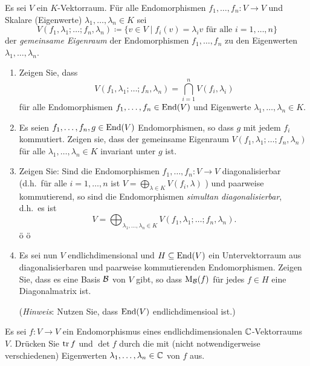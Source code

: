 \documentclass[a4paper,10pt]{scrartcl}
\begin{document}
\begin{question}
  Es sei $V$ ein $K$-Vektorraum.
  Für alle Endomorphismen $f_1, \dotsc, f_n \colon V  \to V$ und Skalare (Eigenwerte) \mbox{$\lambda_1, \dotsc, \lambda_n \in K$} sei
  \[
              V(f_1, \lambda_1; \dotsc; f_n, \lambda_n)
    \coloneqq \{ v \in V \mid \text{$f_i(v) = \lambda_i v$ für alle $i = 1, \dotsc, n$} \}
  \]
  der \emph{gemeinsame Eigenraum} der Endomorphismen $f_1, \dotsc, f_n$ zu den Eigenwerten $\lambda_1, \dotsc, \lambda_n$.
  \begin{enumerate}[leftmargin=*]
    \item
      Zeigen Sie, dass
      \[
          V(f_1, \lambda_1; \dotsc; f_n, \lambda_n)
        = \bigcap_{i=1}^n V(f_i, \lambda_i)
      \]
      für alle Endomorphismen $f_1, \dotsc, f_n \in \operatorname{End}(V)$ und Eigenwerte $\lambda_1, \dotsc, \lambda_n \in K$.
    \item
      Es seien $f_1, \dotsc, f_n, g \in \operatorname{End}(V)$ Endomorphismen, so dass $g$ mit jedem $f_i$ kommutiert.
      Zeigen sie, dass der gemeinsame Eigenraum $V(f_1, \lambda_1; \dots; f_n, \lambda_n)$ für alle $\lambda_1, \dotsc, \lambda_n \in K$ invariant unter $g$ ist.
    \item
      Zeigen Sie: Sind die Endomorphismen $f_1, \dotsc, f_n \colon V \to V$ diagonalisierbar (d.h.\ für alle $i = 1, \dotsc, n$ ist $V = \bigoplus_{\lambda \in K} V(f_i, \lambda)$ ) und paarweise kommutierend, so sind die Endomorphismen \emph{simultan diagonalisierbar}, d.h.\ es ist
      \[
          V
        = \bigoplus_{\lambda_1, \dotsc, \lambda_n \in K}  V(f_1, \lambda_1; \dotsc; f_n, \lambda_n).
      \]
ö    ö\item
      Es sei nun $V$ endlichdimensional und $H \subseteq \operatorname{End}(V)$ ein Untervektorraum aus diagonalisierbaren und paarweise kommutierenden Endomorphismen.
      Zeigen Sie, dass es eine Basis $\mathcal{B}$ von $V$ gibt, so dass $\operatorname{M}_{\mathcal{B}}(f)$ für jedes $f \in H$ eine Diagonalmatrix ist.
      
      (\emph{Hinweis}:
       Nutzen Sie, dass $\operatorname{End}(V)$ endlichdimensioal ist.)
  \end{enumerate}
\end{question}


\begin{question}
  Es sei $f \colon V \to V$ ein Endomorphismus eines endlichdimensionalen $\mathbb{C}$-Vektorraums $V$.
  Drücken Sie $\operatorname{tr} f$ und $\det f$ durch die  mit (nicht notwendigerweise verschiedenen) Eigenwerten $\lambda_1, \dotsc, \lambda_n \in \mathbb{C}$ von $f$ aus.
\end{question}
\end{document}
